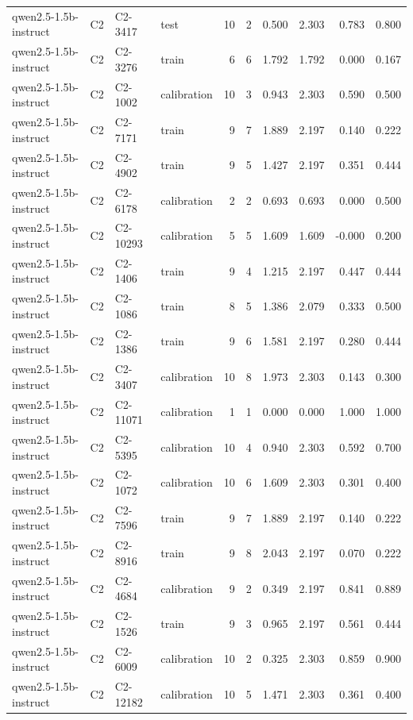 \begin{table}
\begin{tabular}{llllrrrrrr}
qwen2.5-1.5b-instruct & C2 & C2-3417 & test & 10 & 2 & 0.500 & 2.303 & 0.783 & 0.800 \\
qwen2.5-1.5b-instruct & C2 & C2-3276 & train & 6 & 6 & 1.792 & 1.792 & 0.000 & 0.167 \\
qwen2.5-1.5b-instruct & C2 & C2-1002 & calibration & 10 & 3 & 0.943 & 2.303 & 0.590 & 0.500 \\
qwen2.5-1.5b-instruct & C2 & C2-7171 & train & 9 & 7 & 1.889 & 2.197 & 0.140 & 0.222 \\
qwen2.5-1.5b-instruct & C2 & C2-4902 & train & 9 & 5 & 1.427 & 2.197 & 0.351 & 0.444 \\
qwen2.5-1.5b-instruct & C2 & C2-6178 & calibration & 2 & 2 & 0.693 & 0.693 & 0.000 & 0.500 \\
qwen2.5-1.5b-instruct & C2 & C2-10293 & calibration & 5 & 5 & 1.609 & 1.609 & -0.000 & 0.200 \\
qwen2.5-1.5b-instruct & C2 & C2-1406 & train & 9 & 4 & 1.215 & 2.197 & 0.447 & 0.444 \\
qwen2.5-1.5b-instruct & C2 & C2-1086 & train & 8 & 5 & 1.386 & 2.079 & 0.333 & 0.500 \\
qwen2.5-1.5b-instruct & C2 & C2-1386 & train & 9 & 6 & 1.581 & 2.197 & 0.280 & 0.444 \\
qwen2.5-1.5b-instruct & C2 & C2-3407 & calibration & 10 & 8 & 1.973 & 2.303 & 0.143 & 0.300 \\
qwen2.5-1.5b-instruct & C2 & C2-11071 & calibration & 1 & 1 & 0.000 & 0.000 & 1.000 & 1.000 \\
qwen2.5-1.5b-instruct & C2 & C2-5395 & calibration & 10 & 4 & 0.940 & 2.303 & 0.592 & 0.700 \\
qwen2.5-1.5b-instruct & C2 & C2-1072 & calibration & 10 & 6 & 1.609 & 2.303 & 0.301 & 0.400 \\
qwen2.5-1.5b-instruct & C2 & C2-7596 & train & 9 & 7 & 1.889 & 2.197 & 0.140 & 0.222 \\
qwen2.5-1.5b-instruct & C2 & C2-8916 & train & 9 & 8 & 2.043 & 2.197 & 0.070 & 0.222 \\
qwen2.5-1.5b-instruct & C2 & C2-4684 & calibration & 9 & 2 & 0.349 & 2.197 & 0.841 & 0.889 \\
qwen2.5-1.5b-instruct & C2 & C2-1526 & train & 9 & 3 & 0.965 & 2.197 & 0.561 & 0.444 \\
qwen2.5-1.5b-instruct & C2 & C2-6009 & calibration & 10 & 2 & 0.325 & 2.303 & 0.859 & 0.900 \\
qwen2.5-1.5b-instruct & C2 & C2-12182 & calibration & 10 & 5 & 1.471 & 2.303 & 0.361 & 0.400 \\

\end{tabular}
\end{table}
